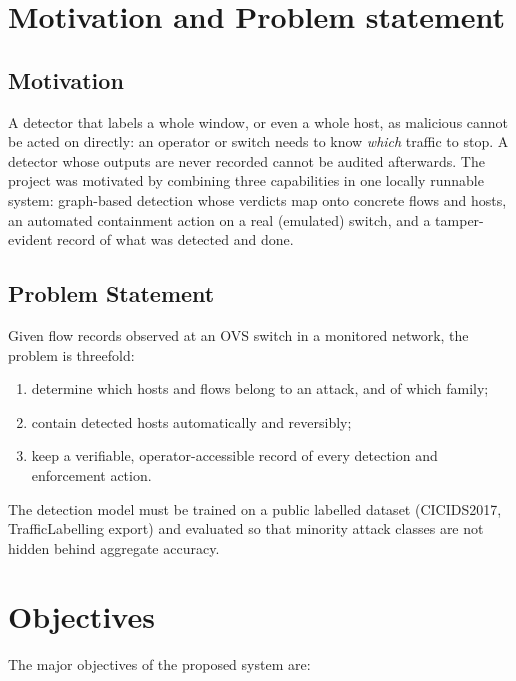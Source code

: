 \documentclass[12pt,a4paper]{report}
\begin{document}
\section{Motivation and Problem statement }
  \subsection{Motivation}
  A detector that labels a whole window, or even a whole host, as malicious cannot be acted on directly: an operator or switch needs to know \emph{which} traffic to stop. A detector whose outputs are never recorded cannot be audited afterwards. The project was motivated by combining three capabilities in one locally runnable system: graph-based detection whose verdicts map onto concrete flows and hosts, an automated containment action on a real (emulated) switch, and a tamper-evident record of what was detected and done.
  \subsection{Problem Statement}
  Given flow records observed at an OVS switch in a monitored network, the problem is threefold:
  \begin{enumerate}
      \item determine which hosts and flows belong to an attack, and of which family;
      \item contain detected hosts automatically and reversibly;
      \item keep a verifiable, operator-accessible record of every detection and enforcement action.
  \end{enumerate}
  The detection model must be trained on a public labelled dataset (CICIDS2017, TrafficLabelling export) and evaluated so that minority attack classes are not hidden behind aggregate accuracy.
\section{Objectives}

The major objectives of the proposed system are:
\end{document}
